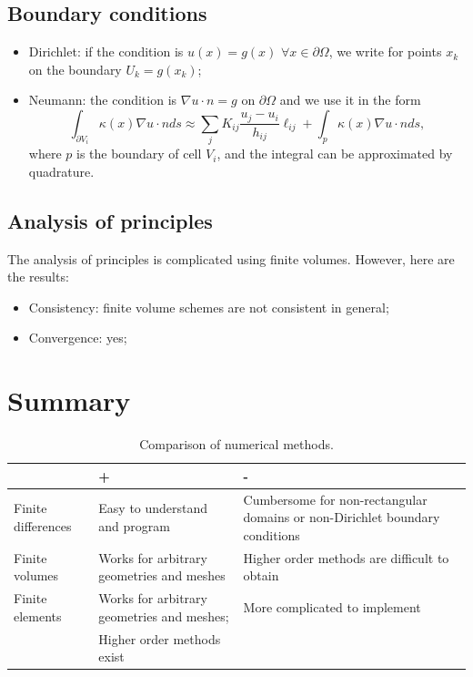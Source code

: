\documentclass[12pt, openany]{report}
\theoremstyle{definition}
\begin{document}
\subsection{Boundary conditions}
\begin{itemize}
	\item Dirichlet: if the condition is $u(x)=g(x)$ $\forall x\in \partial \Omega$, we write for points $x_k$ on the boundary $U_k = g(x_k)$;
	\item Neumann: the condition is $\nabla u\cdot n = g$ on $\partial \Omega$ and we use it in the form \[\int_{\partial V_i}\kappa(x)\nabla u\cdot n ds \approx \sum_j K_{ij}\frac{u_j-u_i}{h_{ij}}\ell_{ij} + \int_p \kappa(x)\nabla u\cdot nds,\] where $p$ is the boundary of cell $V_i$, and the integral can be approximated by quadrature.
\end{itemize}
\subsection{Analysis of principles}
The analysis of principles is complicated using finite volumes. However, here are the results:
\begin{itemize}
	\item Consistency: finite volume schemes are not consistent in general;
	\item Convergence: yes;
\end{itemize}
\section{Summary}
\begin{center}
	\begin{table}[ht]
		\centering
		\begin{tabularx}{\textwidth}{|X|X|X|}
			\hline
			&+ & - \\ \hline \hline
			Finite differences & Easy to understand and program & Cumbersome for non-rectangular domains or non-Dirichlet boundary conditions \\ \hline
			Finite volumes & Works for arbitrary geometries and meshes & Higher order methods are difficult to obtain \\ \hline
			Finite elements & Works for arbitrary geometries and meshes; & More complicated to implement \\
			& Higher order methods exist & \\ \hline
		\end{tabularx}
		\caption{Comparison of numerical methods.}
		\label{tab:comparison}
	\end{table}
\end{center}
\end{document}
